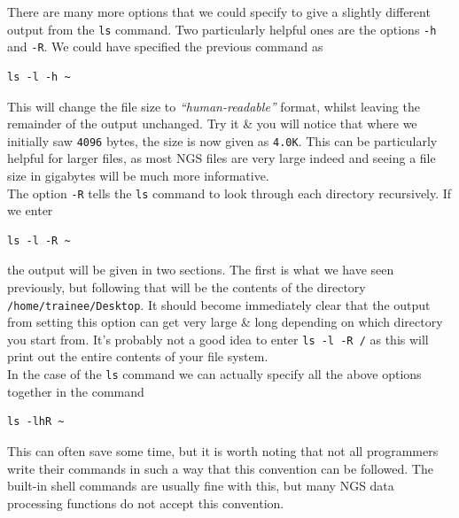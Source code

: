 \begin{advanced}
There are many more options that we could specify to give a slightly different output from the \texttt{ls} command.
Two particularly helpful ones are the options \texttt{-h} and
\texttt{-R}.
We could have specified the previous command as \\
\begin{lstlisting}
ls -l -h ~
\end{lstlisting}

This will change the file size to \textit{``human-readable''} format, whilst leaving the remainder of the output unchanged.
Try it \& you will notice that where we initially saw \texttt{4096} bytes, the size is now given as \texttt{4.0K}.
This can be particularly helpful for larger files, as most NGS files are very large indeed and seeing a file size in gigabytes will be much more informative.\\

The option \texttt{-R} tells the \texttt{ls} command to look through each directory recursively.
If we enter \\
\begin{lstlisting}
ls -l -R ~
\end{lstlisting}

the output will be given in two sections.
The first is what we have seen previously, but following that will be the contents of the directory \texttt{/home/trainee/Desktop}.
It should become immediately clear that the output from setting this option can get very large \& long depending on which directory you start from.
It's probably not a good idea to enter \texttt{ls -l -R /} as this will print out the entire contents of your file system. \\

In the case of the \texttt{ls} command we can actually specify all the above options together in the command \\
\begin{lstlisting}
ls -lhR ~
\end{lstlisting}

This can often save some time, but it is worth noting that not all programmers write their commands in such a way that this convention can be followed.
The built-in shell commands are usually fine with this, but many NGS data processing functions do not accept this convention. \\
\end{advanced}

